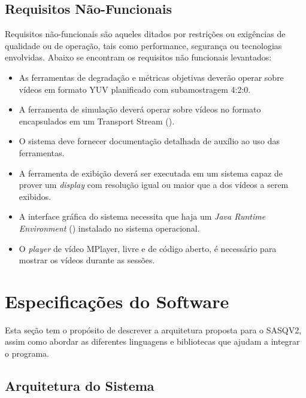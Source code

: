 \subsection{Requisitos Não-Funcionais}

Requisitos não-funcionais são aqueles ditados por restrições ou exigências de qualidade ou de operação, tais como performance, segurança ou tecnologias envolvidas.
Abaixo se encontram os requisitos não funcionais levantados:


\begin{itemize}
	\item As ferramentas de degradação e métricas objetivas deverão operar sobre vídeos em formato YUV planificado com subamostragem 4:2:0.
	\item A ferramenta de simulação deverá operar sobre vídeos no formato  encapsulados em um Transport Stream ().
	\item O sistema deve fornecer documentação detalhada de auxílio ao uso das ferramentas.
	\item A ferramenta de exibição deverá ser executada em um sistema capaz de prover um \emph{display} com resolução igual ou maior que a dos vídeos a serem exibidos.
	\item A interface gráfica do sistema necessita que haja um \emph{Java Runtime Environment} () instalado no sistema operacional.
	\item O \emph{player} de vídeo MPlayer, livre e de código aberto, é necessário para mostrar os vídeos durante as sessões.
\end{itemize}

\section{Especificações do Software}

Esta seção tem o propósito de descrever a arquitetura proposta para o SASQV2, assim como abordar as diferentes linguagens e bibliotecas que ajudam a integrar o programa.

\subsection{Arquitetura do Sistema}

